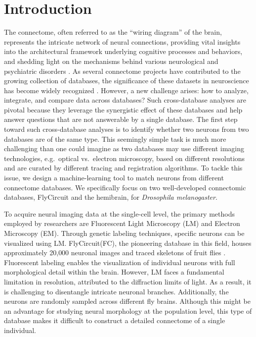 \documentclass[10pt,a4paper]{article}
\begin{document}
\section{Introduction}

The connectome, often referred to as the ``wiring diagram'' of the brain,
represents the intricate network of neural connections, providing vital insights
into the architectural framework underlying cognitive processes and behaviors,
and shedding light on the mechanisms behind various neurological and psychiatric
disorders \citep{Kaiser2013,vandenHeuvel2019,Yu2021}. As several connectome
projects have contributed to the growing collection of databases, the
significance of these datasets in neuroscience has become widely recognized
\citep{Chiang2011,Sotiropoulos2013,Burns2014,Oh2014,Lo2016,Coletta2020,Hulse2021,Dorkenwald2022,Dorkenwald2024,Stampfl2023}.
However, a new challenge arises: how to analyze, integrate, and compare data
across databases? Such cross-database analyses are pivotal because they leverage
the synergistic effect of these databases and help answer questions that are not
answerable by a single database. The first step toward such cross-database
analyses is to identify whether two neurons from two databases are of the same
type. This seemingly simple task is much more challenging than one could imagine
as two databases may use different imaging technologies, e.g.\ optical vs.\
electron microscopy, based on different resolutions and are curated by different
tracing and registration algorithms. To tackle this issue, we design a
machine-learning tool to match neurons from different connectome databases. We
specifically focus on two well-developed connectomic databases, FlyCircuit and
the hemibrain, for \textit{Drosophila melanogaster}.

To acquire neural imaging data at the single-cell level, the primary methods
employed by researchers are Fluorescent Light Microscopy (LM) and Electron
Microscopy (EM). Through genetic labeling techniques, specific neurons can be visualized using LM. FlyCircuit(FC), the pioneering database in this field, houses
approximately 20{,}000 neuronal images and traced skeletons of fruit flies
\citep{Chiang2011,Shih2020}. Fluorescent labeling enables the visualization of
individual neurons with full morphological detail within the brain. However, LM
faces a fundamental limitation in resolution, attributed to the diffraction
limits of light. As a result, it is challenging to disentangle intricate
neuronal branches. Additionally, the neurons are randomly sampled across
different fly brains. Although this might be an advantage for studying neural
morphology at the population level, this type of database makes it difficult to
construct a detailed connectome of a single individual.
\end{document}

